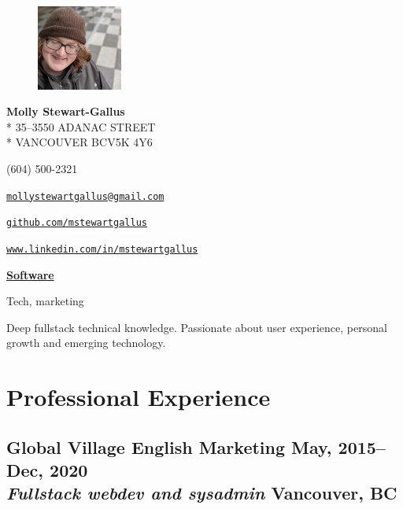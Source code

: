 \documentclass[oneside]{scrartcl}
\makeatletter
\newcommand{\experience}[4]{
  \subsection[#1]{#1 \hfill \small #4 \\
  \textmd{\textit{#2} \hfill #3}}}
\newcommand{\email}{mollystewartgallus@gmail.com}
\newcommand{\github}{github.com/mstewartgallus}
\newcommand{\linkedin}{www.linkedin.com/in/mstewartgallus}
\makeatother
\begin{document}
{
\begin{figure}
  \raggedleft
   \includegraphics[width=0.249\textwidth]{molly-happy}
\end{figure}


{\Large \textbf{Molly Stewart-Gallus}}\\*
35--3550 ADANAC STREET\\*
VANCOUVER BC\hspace{0.5em}V5K 4Y6
\begin{description}[nosep]
\item[Phone] (604) 500-2321
\item[Email] \href{mailto://\email}{\nolinkurl{\email}}
\item[GitHub] \href{https://\github}{\nolinkurl{\github}}
\item[LinkedIn] \href{https://\linkedin}{\nolinkurl{\linkedin}}
\end{description}
}

\bigskip

\underline{\textbf{\LARGE{}Software}}

\bigskip

Tech, marketing

Deep fullstack technical
knowledge. Passionate about user experience, personal growth and
emerging technology.

\section{Professional Experience}
\experience{Global Village English Marketing}
{Fullstack webdev and sysadmin}{Vancouver, BC}{May, 2015--Dec, 2020}
\end{document}
